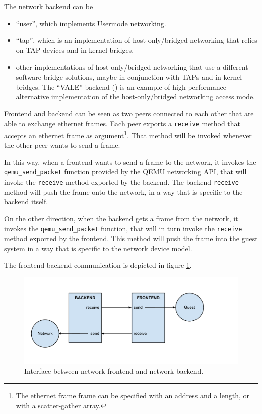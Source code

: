 The network backend can be
\begin{itemize}
    \item ``user'', which implements Usermode networking.
    \item ``tap'', which is an implementation of host-only/bridged networking that relies on TAP devices and in-kernel bridges.
    \item other implementations of host-only/bridged networking that use a different software bridge solutions, maybe in conjunction
	  with TAPs and in-kernel bridges. The ``VALE'' backend (\cite{ref:vale}) is an example of high performance alternative 
	  implementation of the host-only/bridged networking access mode.
\end{itemize}

\vspace{0.5cm}

Frontend and backend can be seen as two peers connected to each other that are able to exchange ethernet frames. Each peer exports a 
\texttt{receive} method that accepts an ethernet frame as argument\footnote{The ethernet frame frame can be specified with an address 
and a length, or with a scatter-gather array.}. That method will be invoked whenever the other peer wants to send a frame.

In this way, when a frontend wants to send a frame to the network, it invokes the \texttt{qemu\_send\_packet} function provided by the QEMU
networking API, that will invoke the \texttt{receive} method exported by the backend. The backend \texttt{receive} method will push the
frame onto the network, in a way that is specific to the backend itself.

On the other direction, when the backend gets a frame from the network, it invokes the \texttt{qemu\_send\_packet} function, that will in turn
invoke the \texttt{receive} method exported by the frontend. This method will push the frame into the guest system in a way that is
specific to the network device model.

The frontend-backend communication is depicted in figure \ref{fig:frontback}.

\begin{figure}[bt]
\centering
\includegraphics[scale = 0.60]{frontend-backend.pdf}
\caption{Interface between network frontend and network backend.}
\label{fig:frontback}
\end{figure}



